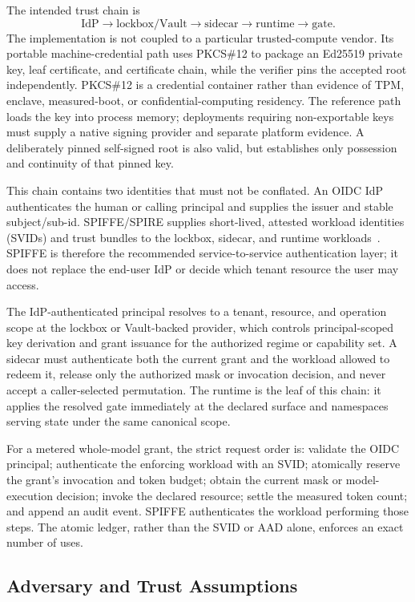 \documentclass[11pt,a4paper]{article}
\begin{document}
The intended trust chain is
\[
\text{IdP} \to
\text{lockbox/Vault} \to \text{sidecar} \to
\text{runtime} \to \text{gate}.
\]
The implementation is not coupled to a particular trusted-compute
vendor.  Its portable machine-credential path uses PKCS\#12 to package an
Ed25519 private key, leaf certificate, and certificate chain, while the
verifier pins the accepted root independently.  PKCS\#12 is a credential
container rather than evidence of TPM, enclave, measured-boot, or
confidential-computing residency.  The reference path loads the key into
process memory; deployments requiring non-exportable keys must supply a
native signing provider and separate platform evidence.  A deliberately
pinned self-signed root is also valid, but establishes only possession and
continuity of that pinned key.

This chain contains two identities that must not be conflated.  An
OIDC IdP authenticates the human or calling principal and supplies the
issuer and stable subject/sub-id.  SPIFFE/SPIRE supplies short-lived,
attested workload identities (SVIDs) and trust bundles to the
lockbox, sidecar, and runtime workloads~\citep{spiffe2026}.  SPIFFE is
therefore the recommended service-to-service authentication layer; it
does not replace the end-user IdP or decide which tenant resource the
user may access.

The IdP-authenticated principal resolves to a tenant, resource, and
operation scope at the lockbox or Vault-backed provider, which controls
principal-scoped key derivation and grant issuance for the authorized
regime or capability set.  A sidecar must authenticate both the
current grant and the workload allowed to redeem it, release only the
authorized mask or invocation decision, and never accept a
caller-selected permutation.  The runtime is the leaf of this chain:
it applies the resolved gate immediately at the declared surface and
namespaces serving state under the same canonical scope.

For a metered whole-model grant, the strict request order is:
validate the OIDC principal; authenticate the enforcing workload with
an SVID; atomically reserve the grant's invocation and
token budget; obtain the current mask or model-execution decision;
invoke the declared resource; settle the measured token count; and
append an audit event.  SPIFFE authenticates the workload performing
those steps.  The atomic ledger, rather than the SVID or AAD alone,
enforces an exact number of uses.

\subsection{Adversary and Trust Assumptions}
\end{document}
